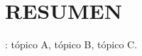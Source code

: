   \label{resumen}
\chapter*{RESUMEN} 

\vspace{-0.4cm}  %
{\linespread{1.35}\selectfont{}

\kant[1-2]  %

}

\vfill
{}: t\'{o}pico A, t\'{o}pico B, t\'{o}pico C.
